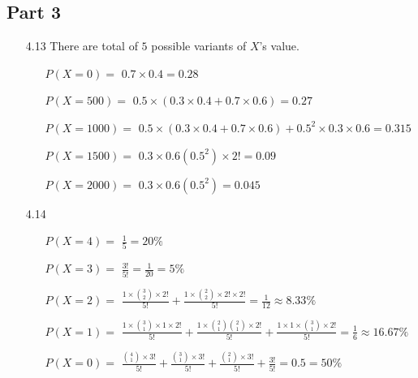 \documentclass{article}
\begin{document}
\subsection*{Part 3}
\begin{itemize}
    \item [4.13] There are total of \(5\) possible variants of \(X\)'s value.
    \begin{itemize}
        \item [\(P(X=0)=\)] \(0.7\times0.4=0.28\)
        \item [\(P(X=500)=\)] \(0.5\times(0.3\times0.4+0.7\times0.6) =0.27 \)
        \item [\(P(X=1000)=\)] \(0.5\times(0.3\times0.4+0.7\times0.6)+0.5^2\times0.3\times0.6=0.315\)
        \item [\(P(X=1500)=\)] \(0.3\times0.6(0.5^2)\times 2! = 0.09\)
        \item [\(P(X=2000)=\)] \(0.3\times0.6(0.5^2) = 0.045\)
    \end{itemize}
    \item [4.14] \
    \begin{itemize}
        \item [\(P(X=4)=\)] \(\frac{1}{5} = 20\%\)
        \item [\(P(X=3)=\)] \(\frac{3!}{5!} = \frac{1}{20}=5\%\)
        \item [\(P(X=2)=\)] \(\frac{1\times\binom{3}{2}\times2!}{5!}+\frac{1\times \binom{2}{2}\times 2!\times 2!}{5!}=\frac{1}{12}\approx8.33\%\)
        \item [\(P(X=1)=\)] \(\frac{1\times\binom{3}{1}\times1\times2!}{5!}+\frac{1\times \binom{2}{1}\binom{2}{1}\times 2!}{5!}+\frac{1\times1\times\binom{3}{1}\times 2!}{5!}=\frac{1}{6}\approx16.67\%\)
        \item [\(P(X=0)=\)] \(\frac{\binom{4}{1}\times 3!}{5!}+\frac{\binom{3}{1}\times 3!}{5!}+\frac{\binom{2}{1}\times 3!}{5!}+\frac{3!}{5!} = 0.5 = 50\%\)
    \end{itemize}
\end{itemize}
\end{document}
